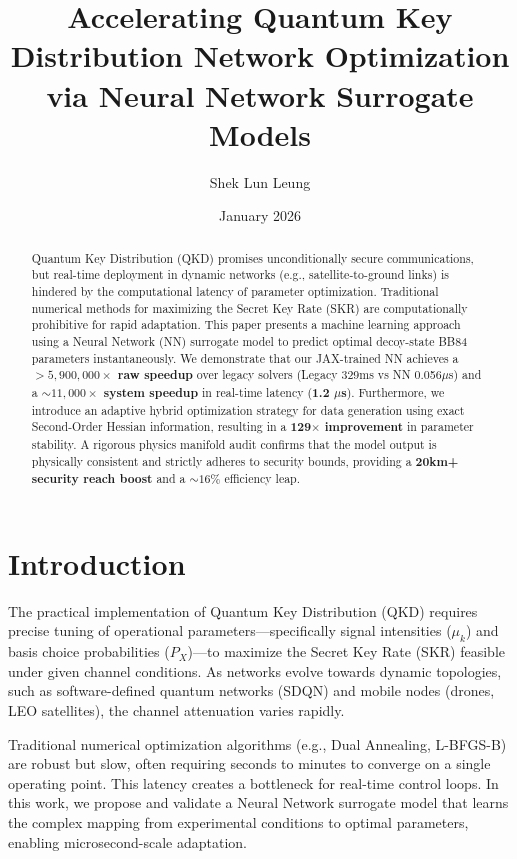 \documentclass[11pt,a4paper]{article}
\title{Accelerating Quantum Key Distribution Network Optimization via Neural Network Surrogate Models}
\author{Shek Lun Leung}
\date{January 2026}
\begin{document}
\maketitle

\begin{abstract}
Quantum Key Distribution (QKD) promises unconditionally secure communications, but real-time deployment in dynamic networks (e.g., satellite-to-ground links) is hindered by the computational latency of parameter optimization. Traditional numerical methods for maximizing the Secret Key Rate (SKR) are computationally prohibitive for rapid adaptation. This paper presents a machine learning approach using a Neural Network (NN) surrogate model to predict optimal decoy-state BB84 parameters instantaneously. We demonstrate that our JAX-trained NN achieves a \textbf{$>5,900,000\times$ raw speedup} over legacy solvers (Legacy 329ms vs NN 0.056$\mu$s) and a \textbf{$\sim 11,000\times$ system speedup} in real-time latency (\textbf{1.2 $\mu$s}). Furthermore, we introduce an adaptive hybrid optimization strategy for data generation using exact Second-Order Hessian information, resulting in a \textbf{129$\times$ improvement} in parameter stability. A rigorous physics manifold audit confirms that the model output is physically consistent and strictly adheres to security bounds, providing a \textbf{20km+ security reach boost} and a \textbf{$\sim 16\%$} efficiency leap.
\end{abstract}

\section{Introduction}
The practical implementation of Quantum Key Distribution (QKD) requires precise tuning of operational parameters—specifically signal intensities ($\mu_k$) and basis choice probabilities ($P_X$)—to maximize the Secret Key Rate (SKR) feasible under given channel conditions. As networks evolve towards dynamic topologies, such as software-defined quantum networks (SDQN) and mobile nodes (drones, LEO satellites), the channel attenuation varies rapidly.

Traditional numerical optimization algorithms (e.g., Dual Annealing, L-BFGS-B) are robust but slow, often requiring seconds to minutes to converge on a single operating point. This latency creates a bottleneck for real-time control loops. In this work, we propose and validate a Neural Network surrogate model that learns the complex mapping from experimental conditions to optimal parameters, enabling microsecond-scale adaptation.
\end{document}
